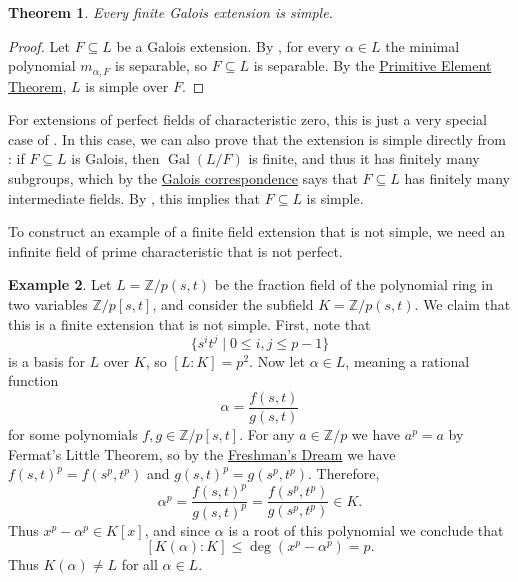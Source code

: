 \documentclass[12pt]{report}
\newtheorem{theorem}{Theorem}[chapter]
\numberwithin{equation}{section}
\numberwithin{theorem}{chapter}
\theoremstyle{definition}
\newtheorem{example}[theorem]{Example}
\newtheorem*{basic properties}{Basic Properties}
\newtheorem*{Important Remark}{Important Remark}
\DeclareMathOperator{\Gal}{Gal}
\newcommand{\Z}{\mathbb{Z}}
\begin{document}
\begin{theorem}
	Every finite Galois extension is simple.
\end{theorem}


\begin{proof}
	Let $F \subseteq L$ be a Galois extension. By , for every $\alpha \in L$ the minimal polynomial $m_{\alpha,F}$ is separable, so $F \subseteq L$ is separable. By the \hyperref[primitive element theorem]{Primitive Element Theorem}, $L$ is simple over $F$.
\end{proof}

For extensions of perfect fields of characteristic zero, this is just a very special case of . In this case, we can also prove that the extension is simple directly from : if $F \subseteq L$ is Galois, then $\Gal(L/F)$ is finite, and thus it has finitely many subgroups, which by the \hyperref[Fundamental Theorem of Galois Theory]{Galois correspondence} says that $F \subseteq L$ has finitely many intermediate fields. By , this implies that $F \subseteq L$ is simple.


To construct an example of a finite field extension that is not simple, we need an infinite field of prime characteristic that is not perfect.


\begin{example}
	Let $L = \Z/p(s,t)$ be the fraction field of the polynomial ring in two variables $\Z/p[s,t]$, and consider the subfield $K = \Z/p(s,t)$. We claim that this is a finite extension that is not simple. First, note that
	$$\lbrace s^i t^j \mid 0 \leqslant i, j \leqslant p-1 \rbrace$$
	is a basis for $L$ over $K$, so $[L : K] = p^2$.
	Now let $\alpha \in L$, meaning a rational function 
	$$\alpha = \frac{f(s,t)}{g(s,t)}$$
	for some polynomials $f, g \in \Z/p[s,t]$. For any $a \in \Z/p$ we have $a^p=a$ by Fermat's Little Theorem, so by the \hyperref[freshmans dream]{Freshman's Dream} we have $f(s,t)^p = f(s^p,t^p)$ and $g(s,t)^p = g(s^p,t^p)$. Therefore,
	$$\alpha^p = \frac{f(s,t)^p}{g(s,t)^p} = \frac{f(s^p,t^p)}{g(s^p,t^p)} \in K.$$
	Thus $x^p-\alpha^p \in K[x]$, and since $\alpha$ is a root of this polynomial we conclude that
	$$[K(\alpha) : K] \leqslant \deg(x^p-\alpha^p) = p.$$	
	Thus $K(\alpha) \neq L$ for all $\alpha \in L$.
\end{example}
\end{document}
